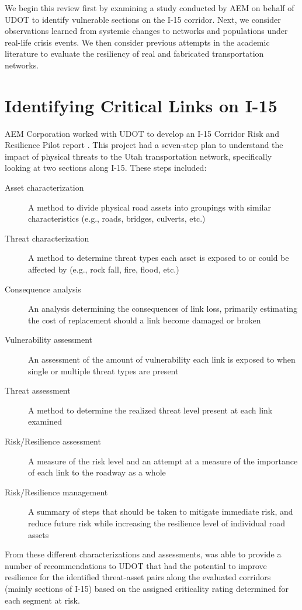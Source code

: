 We begin this review first by examining a study conducted by AEM on
behalf of UDOT to identify
vulnerable sections on the I-15 corridor. Next, we consider observations
learned from systemic
changes to networks and populations under real-life crisis events. We then
consider previous
attempts in the academic literature to evaluate the resiliency of real and fabricated
transportation networks.

\section{Identifying Critical Links on I-15}

AEM Corporation worked with UDOT to develop an I-15 Corridor Risk and Resilience
Pilot report \citep{aem2017}. This
project had a seven-step plan to understand the impact of physical threats
to the Utah
transportation network, specifically looking at two sections along I-15.
These steps included:

\begin{description}
	\item[Asset characterization]{A method to divide physical road assets into
	groupings with similar characteristics (e.g., roads, bridges, culverts, etc.)}
	\item [Threat characterization]{A method to determine threat types each asset
	is exposed to or could be affected by (e.g., rock fall, fire, flood, etc.)}
	\item [Consequence analysis]{An analysis determining the consequences of link
	loss, primarily estimating the cost of replacement should a link become
	damaged or broken}
	\item [Vulnerability assessment] {An assessment of the amount of vulnerability
	each link is exposed to when single or multiple threat types are present}
	\item [Threat assessment] {A method to determine the realized threat level
	present at each link examined}
	\item [Risk/Resilience assessment]  {A measure of the risk level and an attempt
	at a measure of the importance of each link to the roadway as a whole}
	\item [Risk/Resilience management] {A summary of steps that should be taken to
	mitigate immediate risk, and reduce future risk while increasing the
	resilience level of individual road assets}
\end{description}

From these different characterizations and assessments,
\citeauthor{aem2017} was able to provide a number of recommendations to UDOT that had the
potential to improve
resilience for the identified threat-asset pairs along the evaluated corridors (mainly sections of I-15)
based on the assigned criticality rating determined for each segment at risk.

